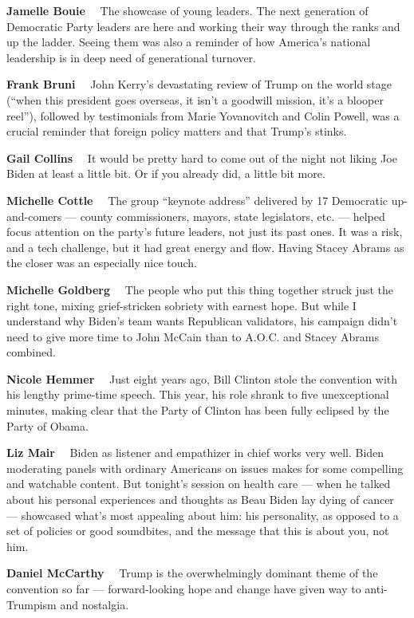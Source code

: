 \textbf{Jamelle Bouie}~~ The showcase of young leaders. The next
generation of Democratic Party leaders are here and working their way
through the ranks and up the ladder. Seeing them was also a reminder of
how America's national leadership is in deep need of generational
turnover.

\textbf{Frank Bruni}~~ John Kerry's devastating review of Trump on the
world stage (``when this president goes overseas, it isn't a goodwill
mission, it's a blooper reel''), followed by testimonials from Marie
Yovanovitch and Colin Powell, was a crucial reminder that foreign policy
matters and that Trump's stinks.

\textbf{Gail Collins}~~ It would be pretty hard to come out of the night
not liking Joe Biden at least a little bit. Or if you already did, a
little bit more.

\textbf{Michelle Cottle}~~ The group ``keynote address'' delivered by 17
Democratic up-and-comers --- county commissioners, mayors, state
legislators, etc. --- helped focus attention on the party's future
leaders, not just its past ones. It was a risk, and a tech challenge,
but it had great energy and flow. Having Stacey Abrams as the closer was
an especially nice touch.

\textbf{Michelle Goldberg}~~ The people who put this thing together
struck just the right tone, mixing grief-stricken sobriety with earnest
hope. But while I understand why Biden's team wants Republican
validators, his campaign didn't need to give more time to John McCain
than to A.O.C. and Stacey Abrams combined.

\textbf{Nicole Hemmer}~~ Just eight years ago, Bill Clinton stole the
convention with his lengthy prime-time speech. This year, his role
shrank to five unexceptional minutes, making clear that the Party of
Clinton has been fully eclipsed by the Party of Obama.

\textbf{Liz Mair}~~ Biden as listener and empathizer in chief works very
well. Biden moderating panels with ordinary Americans on issues makes
for some compelling and watchable content. But tonight's session on
health care --- when he talked about his personal experiences and
thoughts as Beau Biden lay dying of cancer --- showcased what's most
appealing about him: his personality, as opposed to a set of policies or
good soundbites, and the message that this is about you, not him.

\textbf{Daniel McCarthy}~~ Trump is the overwhelmingly dominant theme of
the convention so far --- forward-looking hope and change have given way
to anti-Trumpism and nostalgia.

